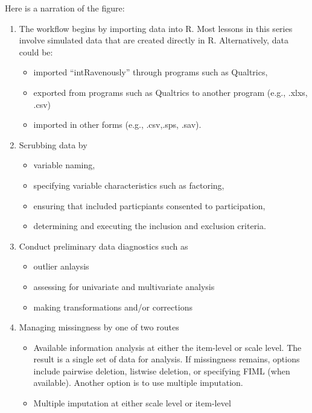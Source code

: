 \documentclass[
  english,
]{book}
\providecommand{\tightlist}{%
  \setlength{\itemsep}{0pt}\setlength{\parskip}{0pt}}
\begin{document}
Here is a narration of the figure:

\begin{enumerate}
\def\labelenumi{\arabic{enumi}.}
\tightlist
\item
  The workflow begins by importing data into R. Most lessons in this series involve simulated data that are created directly in R. Alternatively, data could be:

  \begin{itemize}
  \tightlist
  \item
    imported ``intRavenously'' through programs such as Qualtrics,
  \item
    exported from programs such as Qualtrics to another program (e.g., .xlxs, .csv)
  \item
    imported in other forms (e.g., .csv,.sps, .sav).
  \end{itemize}
\item
  Scrubbing data by

  \begin{itemize}
  \tightlist
  \item
    variable naming,
  \item
    specifying variable characteristics such as factoring,
  \item
    ensuring that included particpiants consented to participation,
  \item
    determining and executing the inclusion and exclusion criteria.
  \end{itemize}
\item
  Conduct preliminary data diagnostics such as

  \begin{itemize}
  \tightlist
  \item
    outlier anlaysis
  \item
    assessing for univariate and multivariate analysis
  \item
    making transformations and/or corrections
  \end{itemize}
\item
  Managing missingness by one of two routes

  \begin{itemize}
  \tightlist
  \item
    Available information analysis \citep{parent_handling_2013} at either the item-level or scale level. The result is a single set of data for analysis. If missingness remains, options include pairwise deletion, listwise deletion, or specifying FIML (when available). Another option is to use multiple imputation.
  \item
    Multiple imputation at either scale level or item-level
  \end{itemize}
\end{enumerate}
\end{document}
